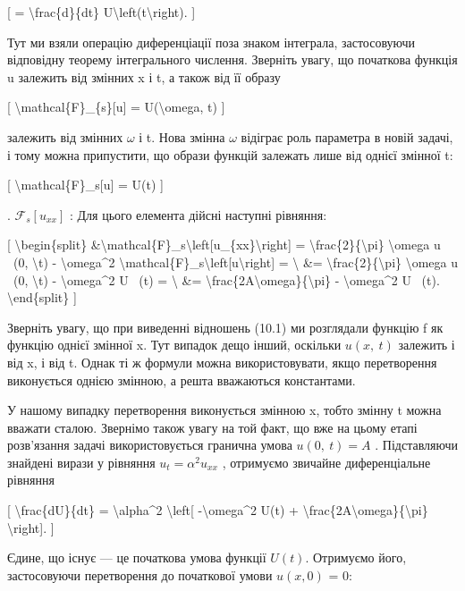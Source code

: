 \documentclass[
]{article}
\begin{document}
{[} = \textbackslash frac\{d\}\{dt\}
U\textbackslash left(t\textbackslash right). {]}

Тут ми взяли операцію диференціації поза знаком інтеграла, застосовуючи
відповідну теорему інтегрального числення. Зверніть увагу, що початкова
функція u залежить від змінних x і t, а також від її образу

{[} \textbackslash mathcal\{F\}\_\{s\}{[}u{]} = U(\textbackslash omega,
t) {]}

залежить від змінних \(\omega\) і t. Нова змінна \(\omega\) відіграє
роль параметра в новій задачі, і тому можна припустити, що образи
функцій залежать лише від однієї змінної t:

{[} \textbackslash mathcal\{F\}\_s{[}u{]} = U(t) {]}

. \({\mathscr F}_s[u_{xx}]\) : Для цього елемента дійсні наступні
рівняння:

{[} \textbackslash begin\{split\}
\&\textbackslash mathcal\{F\}\_s\textbackslash left{[}u\_\{xx\}\textbackslash right{]}
= \textbackslash frac\{2\}\{\textbackslash pi\} \textbackslash omega u
~(0, \textbackslash t) - \textbackslash omega\^{}2
\textbackslash mathcal\{F\}\_s\textbackslash left{[}u\textbackslash right{]}
= \textbackslash{} \&= \textbackslash frac\{2\}\{\textbackslash pi\}
\textbackslash omega u ~(0, \textbackslash t) -
\textbackslash omega\^{}2 U ~(t) = \textbackslash{} \&=
\textbackslash frac\{2A\textbackslash omega\}\{\textbackslash pi\} -
\textbackslash omega\^{}2 U ~(t). \textbackslash end\{split\} {]}

Зверніть увагу, що при виведенні відношень (10.1) ми розглядали функцію
f як функцію однієї змінної x. Тут випадок дещо інший, оскільки
\(u\left(x,\ t\right)\) залежить і від x, і від t. Однак ті ж формули
можна використовувати, якщо перетворення виконується однією змінною, а
решта вважаються константами.

У нашому випадку перетворення виконується змінною x, тобто змінну t
можна вважати сталою. Звернімо також увагу на той факт, що вже на цьому
етапі розв'язання задачі використовується гранична умова
\(u\left(0,\ t\right)=A\) . Підставляючи знайдені вирази у рівняння
\(u_{t}=\alpha^{2}u_{xx}\) , отримуємо звичайне диференціальне рівняння

{[} \textbackslash frac\{dU\}\{dt\} = \textbackslash alpha\^{}2
\textbackslash left{[} -\textbackslash omega\^{}2 U(t) +
\textbackslash frac\{2A\textbackslash omega\}\{\textbackslash pi\}
\textbackslash right{]}. {]}

Єдине, що існує --- це початкова умова функції \(U(t)\). Отримуємо його,
застосовуючи перетворення до початкової умови \(u(x, 0)\) = 0:
\end{document}
